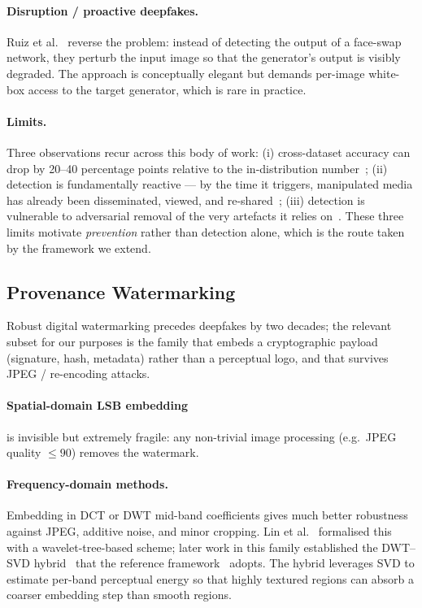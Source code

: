 \documentclass[11pt,a4paper]{article}
\theoremstyle{definition}
\theoremstyle{plain}
\theoremstyle{remark}
\begin{document}
\paragraph{Disruption / proactive deepfakes.}
Ruiz et al.~\cite{bib47} reverse the problem: instead of detecting
the output of a face-swap network, they perturb the input image so
that the generator's output is visibly degraded. The approach is
conceptually elegant but demands per-image white-box access to the
target generator, which is rare in practice.

\paragraph{Limits.}
Three observations recur across this body of work:
(i) cross-dataset accuracy can drop by 20--40 percentage points
relative to the in-distribution number~\cite{bib3,bib6};
(ii) detection is fundamentally reactive --- by the time it triggers,
manipulated media has already been disseminated, viewed, and
re-shared~\cite{bib4,bib50};
(iii) detection is vulnerable to adversarial removal of the very
artefacts it relies on~\cite{bib46,bib47}.
These three limits motivate \emph{prevention} rather than detection
alone, which is the route taken by the framework we extend.

\subsection{Provenance Watermarking}\label{sec:lit-wm}

Robust digital watermarking precedes deepfakes by two decades; the
relevant subset for our purposes is the family that embeds a
cryptographic payload (signature, hash, metadata) rather than a
perceptual logo, and that survives JPEG / re-encoding attacks.

\paragraph{Spatial-domain LSB embedding} is invisible but extremely
fragile: any non-trivial image processing (e.g.\ JPEG quality
$\leq\!90$) removes the watermark.

\paragraph{Frequency-domain methods.}
Embedding in DCT or DWT mid-band coefficients gives much better
robustness against JPEG, additive noise, and minor cropping. Lin et
al.~\cite{bib37} formalised this with a wavelet-tree-based scheme;
later work in this family established the DWT--SVD
hybrid~\cite{bib38} that the reference framework~\cite{bib4} adopts.
The hybrid leverages SVD to estimate per-band perceptual energy so
that highly textured regions can absorb a coarser embedding step than
smooth regions.
\end{document}
